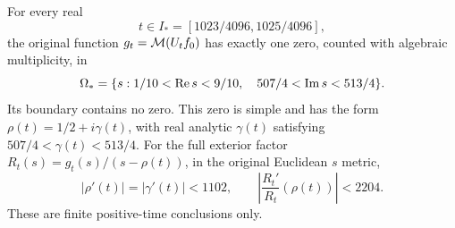 \documentclass[11pt]{article}
\begin{document}
\begin{pmreceivertheorem}
\label{pmreceiver:PMH10}
For every real
\begin{equation}\label{pmreceiver:PMH10-time}
 t\in I_*=[1023/4096,1025/4096],
\end{equation}
the original function $g_t=\mathcal M(U_tf_0)$ has exactly one zero,
counted with algebraic multiplicity, in
\begin{equation}\label{pmreceiver:PMH10-rectangle}
 \Omega_*=
 \{s:1/10<\operatorname{Re} s<9/10,\quad507/4<\operatorname{Im} s<513/4\}.
\end{equation}
Its boundary contains no zero. This zero is simple and has the form
$\rho(t)=1/2+i\gamma(t)$, with real analytic $\gamma(t)$ satisfying
$507/4<\gamma(t)<513/4$. For the full exterior factor
$R_t(s)=g_t(s)/(s-\rho(t))$, in the original Euclidean $s$ metric,
\begin{equation}\label{pmreceiver:PMH10-speed}
 |\rho'(t)|=|\gamma'(t)|<1102,\qquad
 \left|\frac{R_t'}{R_t}(\rho(t))\right|<2204.
\end{equation}
These are finite positive-time conclusions only.
\end{pmreceivertheorem}
\end{document}
